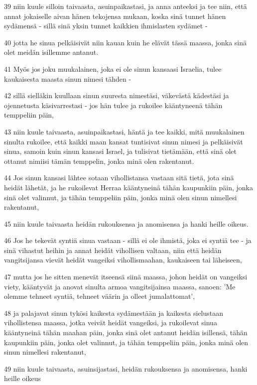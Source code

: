 \par 39 niin kuule silloin taivaasta, asuinpaikastasi, ja anna anteeksi ja tee niin, että annat jokaiselle aivan hänen tekojensa mukaan, koska sinä tunnet hänen sydämensä - sillä sinä yksin tunnet kaikkien ihmislasten sydämet -
\par 40 jotta he sinua pelkäisivät niin kauan kuin he elävät tässä maassa, jonka sinä olet meidän isillemme antanut.
\par 41 Myös jos joku muukalainen, joka ei ole sinun kansaasi Israelia, tulee kaukaisesta maasta sinun nimesi tähden -
\par 42 sillä sielläkin kuullaan sinun suuresta nimestäsi, väkevästä kädestäsi ja ojennetusta käsivarrestasi - jos hän tulee ja rukoilee kääntyneenä tähän temppeliin päin,
\par 43 niin kuule taivaasta, asuinpaikastasi, häntä ja tee kaikki, mitä muukalainen sinulta rukoilee, että kaikki maan kansat tuntisivat sinun nimesi ja pelkäisivät sinua, samoin kuin sinun kansasi Israel, ja tulisivat tietämään, että sinä olet ottanut nimiisi tämän temppelin, jonka minä olen rakentanut.
\par 44 Jos sinun kansasi lähtee sotaan vihollistansa vastaan sitä tietä, jota sinä heidät lähetät, ja he rukoilevat Herraa kääntyneinä tähän kaupunkiin päin, jonka sinä olet valinnut, ja tähän temppeliin päin, jonka minä olen sinun nimellesi rakentanut,
\par 45 niin kuule taivaasta heidän rukouksensa ja anomisensa ja hanki heille oikeus.
\par 46 Jos he tekevät syntiä sinua vastaan - sillä ei ole ihmistä, joka ei syntiä tee - ja sinä vihastut heihin ja annat heidät vihollisen valtaan, niin että heidän vangitsijansa vievät heidät vangeiksi vihollismaahan, kaukaiseen tai läheiseen,
\par 47 mutta jos he sitten menevät itseensä siinä maassa, johon heidät on vangeiksi viety, kääntyvät ja anovat sinulta armoa vangitsijainsa maassa, sanoen: 'Me olemme tehneet syntiä, tehneet väärin ja olleet jumalattomat',
\par 48 ja palajavat sinun tykösi kaikesta sydämestään ja kaikesta sielustaan vihollistensa maassa, jotka veivät heidät vangeiksi, ja rukoilevat sinua kääntyneinä tähän maahan päin, jonka sinä olet antanut heidän isillensä, tähän kaupunkiin päin, jonka olet valinnut, ja tähän temppeliin päin, jonka minä olen sinun nimellesi rakentanut,
\par 49 niin kuule taivaasta, asuinsijastasi, heidän rukouksensa ja anomisensa, hanki heille oikeus
